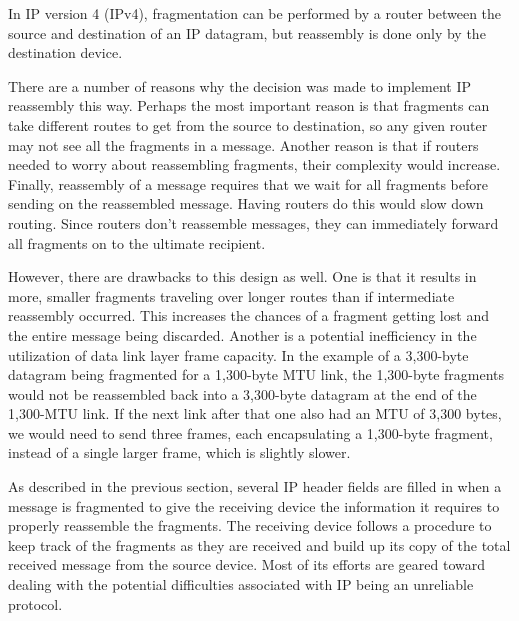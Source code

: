 In IP version 4 (IPv4), fragmentation can be performed by a router
between the source and destination of an IP datagram, but reassembly is
done only by the destination device.

There are a number of reasons why the decision was made to implement IP
reassembly this way. Perhaps the most important reason is that fragments
can take different routes to get from the source to destination, so any
given router may not see all the fragments in a message. Another reason
is that if routers needed to worry about reassembling fragments, their
complexity would increase. Finally, reassembly of a message requires
that we wait for all fragments before sending on the reassembled
message. Having routers do this would slow down routing. Since routers
don't reassemble messages, they can immediately forward all fragments on
to the ultimate recipient.

However, there are drawbacks to this design as well. One is that it
results in more, smaller fragments traveling over longer routes than if
intermediate reassembly occurred. This increases the chances of a
fragment getting lost and the entire message being discarded. Another is
a potential inefficiency in the utilization of data link layer frame
capacity. In the example of a 3,300-byte datagram being fragmented for a
1,300-byte MTU link, the 1,300-byte fragments would not be reassembled
back into a 3,300-byte datagram at the end of the 1,300-MTU link. If the
next link after that one also had an MTU of 3,300 bytes, we would need
to send three frames, each encapsulating a 1,300-byte fragment, instead
of a single larger frame, which is slightly slower.

As described in the previous section, several IP header fields are
filled in when a message is fragmented to give the receiving device the
information it requires to properly reassemble the fragments. The
receiving device follows a procedure to keep track of the fragments as
they are received and build up its copy of the total received message
from the source device. Most of its efforts are geared toward dealing
with the potential difficulties associated with IP being an unreliable
protocol.


